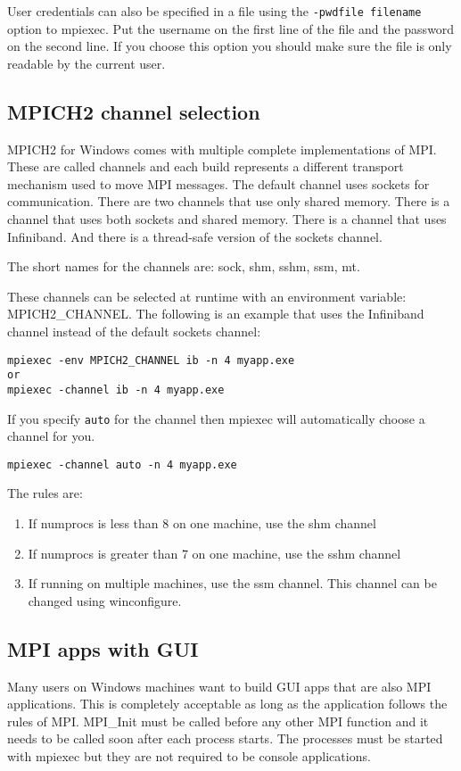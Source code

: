 \documentclass[dvipdfm,11pt]{article}
\begin{document}
User credentials can also be specified in a file using the \texttt{-pwdfile filename}
option to mpiexec.  Put the username on the first line of the file and the password
on the second line.  If you choose this option you should make sure the file is
only readable by the current user.

\subsection{MPICH2 channel selection}
MPICH2 for Windows comes with multiple complete implementations of MPI.  These are called
channels and each build represents a different transport mechanism used to move MPI messages.
The default channel uses sockets for communication.  There are two channels that use only
shared memory.  There is a channel that uses both sockets and shared memory.  There is a
channel that uses Infiniband.  And there is a thread-safe version of the sockets channel.

The short names for the channels are: sock, shm, sshm, ssm, mt.

These channels can be selected at runtime with an environment variable: MPICH2\_CHANNEL.
The following is an example that uses the Infiniband channel instead of the default sockets
channel:

\begin{verbatim}
mpiexec -env MPICH2_CHANNEL ib -n 4 myapp.exe
or
mpiexec -channel ib -n 4 myapp.exe
\end{verbatim}

If you specify \texttt{auto} for the channel then mpiexec will automatically choose a
channel for you.
\begin{verbatim}
mpiexec -channel auto -n 4 myapp.exe
\end{verbatim}
The rules are:
\begin{enumerate}
\item If numprocs is less than 8 on one machine, use the shm channel
\item If numprocs is greater than 7 on one machine, use the sshm channel
\item If running on multiple machines, use the ssm channel.  This channel can be changed 
using winconfigure.
\end{enumerate}

\subsection{MPI apps with GUI}
Many users on Windows machines want to build GUI apps that are also MPI applications.  This is
completely acceptable as long as the application follows the rules of MPI.  MPI\_Init must be
called before any other MPI function and it needs to be called soon after each process starts.
The processes must be started with mpiexec but they are not required to be console applications.
\end{document}
